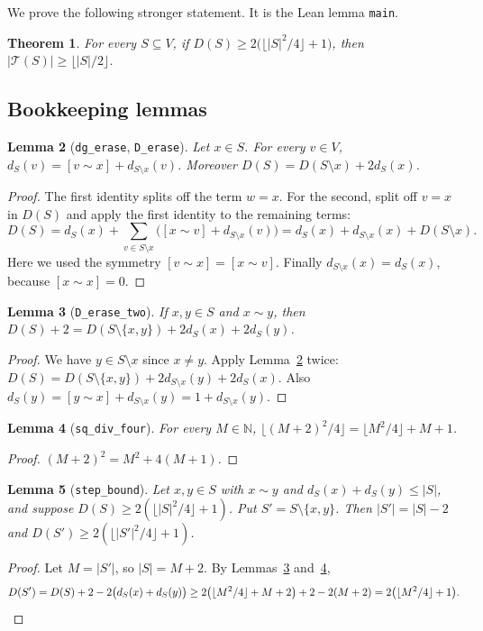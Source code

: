 \documentclass[11pt]{amsart}
\theoremstyle{plain}
\newtheorem{theorem}{Theorem}
\newtheorem{lemma}[theorem]{Lemma}
\theoremstyle{definition}
\newcommand{\Tri}{\mathcal{T}}
\newcommand{\adj}{\sim}
\newcommand{\lean}[1]{\texttt{#1}}
\begin{document}
We prove the following stronger statement. It is the Lean lemma \lean{main}.

\begin{theorem}\label{thm:strong}
For every $S\subseteq V$, if $D(S)\ge 2\bigl(\lfloor |S|^2/4\rfloor+1\bigr)$, then
$|\Tri(S)|\ge\lfloor |S|/2\rfloor$.
\end{theorem}

\subsection{Bookkeeping lemmas}

\begin{lemma}[\lean{dg\_erase}, \lean{D\_erase}]\label{lem:erase}
Let $x\in S$. For every $v\in V$, $d_S(v)=[v\adj x]+d_{S\setminus x}(v)$. Moreover
$D(S)=D(S\setminus x)+2d_S(x)$.
\end{lemma}
\begin{proof}
The first identity splits off the term $w=x$. For the second, split off $v=x$ in $D(S)$ and apply
the first identity to the remaining terms:
\[
  D(S)=d_S(x)+\sum_{v\in S\setminus x}\bigl([x\adj v]+d_{S\setminus x}(v)\bigr)
      =d_S(x)+d_{S\setminus x}(x)+D(S\setminus x).
\]
Here we used the symmetry $[v\adj x]=[x\adj v]$. Finally $d_{S\setminus x}(x)=d_S(x)$, because
$[x\adj x]=0$.
\end{proof}

\begin{lemma}[\lean{D\_erase\_two}]\label{lem:erase2}
If $x,y\in S$ and $x\adj y$, then $D(S)+2=D(S\setminus\{x,y\})+2d_S(x)+2d_S(y)$.
\end{lemma}
\begin{proof}
We have $y\in S\setminus x$ since $x\ne y$. Apply Lemma~\ref{lem:erase} twice:
$D(S)=D(S\setminus\{x,y\})+2d_{S\setminus x}(y)+2d_S(x)$. Also
$d_S(y)=[y\adj x]+d_{S\setminus x}(y)=1+d_{S\setminus x}(y)$.
\end{proof}

\begin{lemma}[\lean{sq\_div\_four}]\label{lem:arith}
For every $M\in\mathbb N$, $\lfloor (M+2)^2/4\rfloor=\lfloor M^2/4\rfloor+M+1$.
\end{lemma}
\begin{proof}
$(M+2)^2=M^2+4(M+1)$.
\end{proof}

\begin{lemma}[\lean{step\_bound}]\label{lem:step}
Let $x,y\in S$ with $x\adj y$ and $d_S(x)+d_S(y)\le|S|$, and suppose
$D(S)\ge2(\lfloor|S|^2/4\rfloor+1)$. Put $S'=S\setminus\{x,y\}$. Then $|S'|=|S|-2$ and
$D(S')\ge 2(\lfloor|S'|^2/4\rfloor+1)$.
\end{lemma}
\begin{proof}
Let $M=|S'|$, so $|S|=M+2$. By Lemmas~\ref{lem:erase2} and~\ref{lem:arith},
\[
  D(S')=D(S)+2-2\bigl(d_S(x)+d_S(y)\bigr)
  \ge 2\bigl(\lfloor M^2/4\rfloor+M+2\bigr)+2-2(M+2)=2\bigl(\lfloor M^2/4\rfloor+1\bigr).\qedhere
\]
\end{proof}
\end{document}

